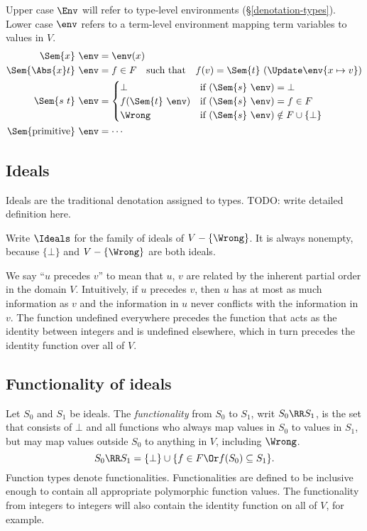 \documentclass{amsart}
\theoremstyle{definition}
\begin{document}
Upper case $\Env$ will refer to type-level environments
(\S\ref{denotation-types}). Lower case $\env$ refers to a
term-level environment mapping term variables to values in $V$.
\begin{align*}
\Sem{x}~\env&=\env(x)\\
\Sem{\Abs{x}t}~\env&=
  f\in F\text{\quad such that\quad}
  f(v)=\Sem{t}~(\Update\env{x\mapsto v})
\\
\Sem{s~t}~\env&=
\begin{cases}
\bot&\text{if }(\Sem{s}~\env)=\bot
\\
f(\Sem{t}~\env)&\text{if }(\Sem{s}~\env)=f\in F
\\
\Wrong&\text{if }(\Sem{s}~\env)\notin F\cup\{\bot\}
\end{cases}
\\
\Sem{\mathrm{primitive}}~\env&=\cdots
\end{align*}

\subsection{Ideals}
\label{ideal}
Ideals are the traditional denotation assigned to types. TODO:
write detailed definition here.

Write $\Ideals$ for the family of ideals of $V-\{\Wrong\}$. It is
always nonempty, because $\{\bot\}$ and ${V-\{\Wrong\}}$ are both
ideals.

We say ``$u$ precedes $v$'' to mean that $u$, $v$ are related by
the inherent partial order in the domain $V$. Intuitively, if $u$
precedes $v$, then $u$ has at most as much information as $v$ and
the information in $u$ never conflicts with the information in
$v$. The function undefined everywhere precedes the function that
acts as the identity between integers and is undefined elsewhere,
which in turn precedes the identity function over all of $V$.

\subsection{Functionality of ideals}
\label{functionality}
Let $S_0$ and $S_1$ be ideals. The \emph{functionality} from
$S_0$ to $S_1$, writ $S_0\RR S_1$, is the set that consists of
$\bot$ and all functions who always map values in $S_0$ to values
in $S_1$, but may map values outside $S_0$ to anything in $V$,
including $\Wrong$.
\[
S_0 \RR S_1 =
\{\bot\}\cup\{f\in F \Or f(S_0) \subseteq S_1\}.
\]
Function types denote functionalities. Functionalities are
defined to be inclusive enough to contain all appropriate
polymorphic function values. The functionality from integers to
integers will also contain the identity function on all of $V$,
for example.
\end{document}
